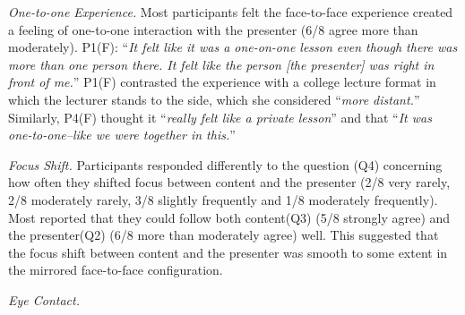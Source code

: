 \documentclass[sigchi-a]{acmart}
\begin{document}
\textit{One-to-one Experience.}
Most participants felt the face-to-face experience created a feeling of one-to-one interaction with the presenter (6/8 agree more than moderately).
P1(F): ``\textit{It felt like it was a one-on-one lesson even though there was more than one person there. It felt like the person [the presenter] was right in front of me.}''
P1(F) contrasted the experience with a college lecture format in which the lecturer stands to the side, which she considered ``\textit{more distant.}'' 
Similarly, P4(F) thought it ``\textit{really felt like a private lesson}'' and that  ``\textit{It was one-to-one--like we were together in this.}''

\textit{Focus Shift.}
 Participants responded differently to the question (Q4) concerning how often they shifted focus between content and the presenter (2/8 very rarely, 2/8 moderately rarely, 3/8 slightly frequently and 1/8 moderately frequently).  Most reported that they could follow both content(Q3) (5/8 strongly agree) and the presenter(Q2) (6/8 more than moderately agree) well. This suggested that the focus shift between content and the presenter was smooth to some extent in the mirrored face-to-face configuration.

\textit{Eye Contact.}
\end{document}
